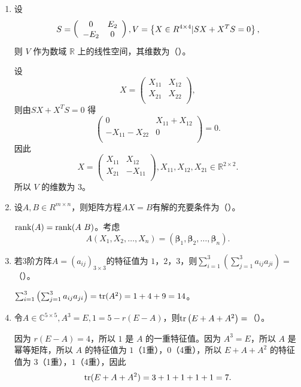 \begin{enumerate}[1~]
\begin{enumerate}[1.~]
\item
设 
$$
S = \left( \begin{array} { c c } { 0 } & { E _ { 2 } } \\ { - E _ { 2 } } & { 0 } \end{array} \right) , V = \left\{ X \in R ^ { 4 \times 4 } | S X + X ^ { T } S = 0 \right\},
$$
则 $V$ 作为数域 $\mathbb{R}$ 上的线性空间，其维数为（\quad）。

\begin{solution}
设\[
X=\left( \begin{matrix}
	X_{11}&		X_{12}\\
	X_{21}&		X_{22}\\
\end{matrix} \right) ,
\]
则由$
SX+X^TS=0
$
得\[
\left( \begin{matrix}
	0&		X_{11}+X_{12}\\
	-X_{11}-X_{22}&		0\\
\end{matrix} \right)=0.
\]
因此\[
X=\left( \begin{matrix}
	X_{11}&		X_{12}\\
	X_{21}&		-X_{11}\\
\end{matrix} \right), X_{11}, X_{12}, X_{21}\in \mathbb{R}^{2\times 2}.
\]
所以 $V$ 的维数为 $3$。
\end{solution}

\item
设$A , B \in R ^ { m \times n }$，则矩阵方程$A X = B$有解的充要条件为（\quad）。
\begin{solution}
${\rm rank}(A)={\rm rank}(A\ B)$。考虑\[
A(X_1, X_2, \dots, X_n)=(\boldsymbol{\beta}_1, \boldsymbol{\beta}_2, \dots, \boldsymbol{\beta}_n).
\]
\end{solution}

\item
若$3$阶方阵$A=(a_{ij})_{3\times 3}$的特征值为 $1$，$2$，$3$，则$\sum _ { i = 1 } ^ { 3 } \left( \sum _ { j = 1 } ^ { 3 } a _ { i j } a _ { j i } \right) =$（\quad）。
\begin{solution}
$\sum _ { i = 1 } ^ { 3 } \left( \sum _ { j = 1 } ^ { 3 } a _ { i j } a _ { j i } \right) = {\rm tr}(A^2)=1+4+9=14$。
\end{solution}

\item
令$A \in \mathbb{C} ^ { 5 \times 5 } ,  A ^ { 3 } = E ,  1 = 5 - r ( E - A )$，则${\rm tr} \left( E + A + A ^ { 2 } \right) =$（\quad）。
\begin{solution}
因为 $r(E-A)=4$，所以 $1$ 是 $A$ 的一重特征值。因为 $A^3=E$，所以 $A$ 是幂等矩阵，所以 $A$ 的特征值为 $1$（1重），$0$（4重），所以 $E+A+A^2$ 的特征值为 $3$（1重），$1$（4重），因此\[
{\rm tr}(E+A+A^2)=3+1+1+1+1=7.
\]
\end{solution}


\end{enumerate}
\end{enumerate}
